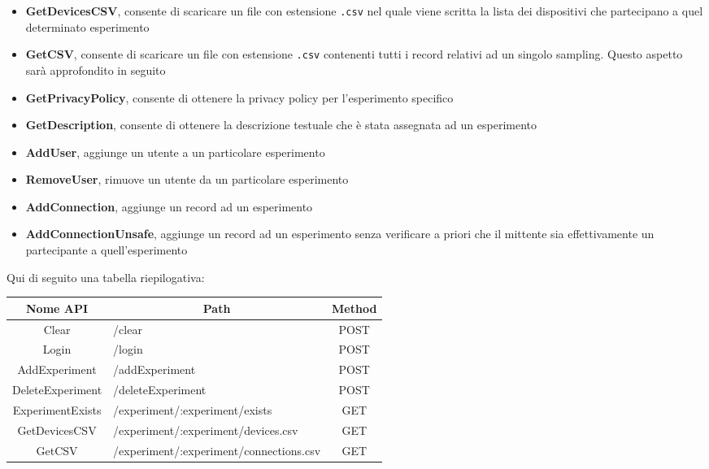 \documentclass[12pt,twoside]{report}
\begin{document}
\begin{enumerate}
\begin{itemize}
    \item \textbf{GetDevicesCSV}, consente di scaricare un file con estensione \texttt{.csv} nel quale viene scritta la lista dei dispositivi che partecipano a quel determinato esperimento
    \item \textbf{GetCSV}, consente di scaricare un file con estensione \texttt{.csv} contenenti tutti i record relativi ad un singolo sampling. Questo aspetto sarà approfondito in seguito
    \item \textbf{GetPrivacyPolicy}, consente di ottenere la privacy policy per l'esperimento specifico
    \item \textbf{GetDescription}, consente di ottenere la descrizione testuale che è stata assegnata ad un esperimento
    \item \textbf{AddUser}, aggiunge un utente a un particolare esperimento
    \item \textbf{RemoveUser}, rimuove un utente da un particolare esperimento
    \item \textbf{AddConnection}, aggiunge un record ad un esperimento
    \item \textbf{AddConnectionUnsafe}, aggiunge un record ad un esperimento senza verificare a priori che il mittente sia effettivamente un partecipante a quell'esperimento
\end{itemize}
Qui di seguito una tabella riepilogativa:
\FloatBarrier
    \begin{table}[h]
    \centering
    \label{tab:my-table}
    \begin{tabular}{|c|l|c|}
    \hline
    Nome API            & \multicolumn{1}{c|}{Path}                   & Method \\ \hline
    Clear               & /clear                                      & POST    \\ \hline
    Login               & /login                                      & POST    \\ \hline
    AddExperiment       & /addExperiment                              & POST    \\ \hline
    DeleteExperiment    & /deleteExperiment                           & POST    \\ \hline
    ExperimentExists    & /experiment/:experiment/exists              & GET     \\ \hline
    GetDevicesCSV       & /experiment/:experiment/devices.csv         & GET     \\ \hline
    GetCSV              & /experiment/:experiment/connections.csv     & GET     \\ \hline

\end{tabular}
\end{table}
\end{enumerate}
\end{document}

